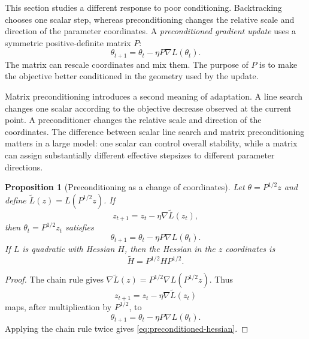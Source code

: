 \documentclass[11pt,twoside]{article}
\newtheorem{proposition}[theorem]{Proposition}
\theoremstyle{definition}
\theoremstyle{remark}
\begin{document}
This section studies a different response to poor conditioning. Backtracking
chooses one scalar step, whereas preconditioning changes the relative scale
and direction of the parameter coordinates. A \emph{preconditioned gradient
update} uses a symmetric positive-definite matrix $P$:
\begin{equation}
 \theta_{t+1}=\theta_t-\eta P\nabla L(\theta_t).
 \label{eq:preconditioned-update}
\end{equation}
The matrix can rescale coordinates and mix them. The purpose of $P$ is to make
the objective better conditioned in the geometry used by the update.

Matrix preconditioning introduces a second meaning of adaptation. A line
search changes one scalar according to the objective decrease observed at the
current point. A
preconditioner changes the relative scale and direction of the coordinates.
The difference between scalar line search and matrix preconditioning matters
in a large model: one scalar can control overall stability, while a matrix can
assign substantially different effective stepsizes to different parameter
directions.

\begin{proposition}[Preconditioning as a change of coordinates]
\label{prop:preconditioning-coordinates}
Let $\theta=P^{1/2}z$ and define
$\widetilde L(z)=L(P^{1/2}z)$. If
\begin{equation}
 z_{t+1}=z_t-\eta\nabla\widetilde L(z_t),
 \label{eq:preconditioned-z-update}
\end{equation}
then $\theta_t=P^{1/2}z_t$ satisfies
\begin{equation}
 \theta_{t+1}=\theta_t-\eta P\nabla L(\theta_t).
 \label{eq:preconditioning-coordinate-equivalence}
\end{equation}
If $L$ is quadratic with Hessian $H$, then
the Hessian in the $z$ coordinates is
\begin{equation}
 \widetilde H=P^{1/2}HP^{1/2}.
 \label{eq:preconditioned-hessian}
\end{equation}
\end{proposition}

\begin{proof}
The chain rule gives
$\nabla\widetilde L(z)=P^{1/2}\nabla L(P^{1/2}z)$. Thus
\[
 z_{t+1}=z_t-\eta\nabla\widetilde L(z_t)
\]
maps, after multiplication by $P^{1/2}$, to
\[
 \theta_{t+1}=\theta_t-\eta P\nabla L(\theta_t).
\]
Applying the chain rule twice gives \cref{eq:preconditioned-hessian}.
\end{proof}
\end{document}
